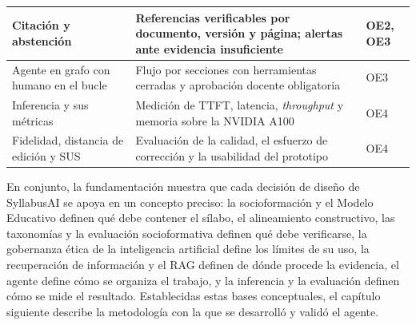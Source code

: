 \begin{table}[htbp]
\begin{tabular}{|>{\raggedright\arraybackslash}p{3.8cm}|>{\raggedright\arraybackslash}p{7.2cm}|>{\centering\arraybackslash}p{1.6cm}|}
    \hline
    Citación y abstención~\cite{gao2023alce} & Referencias verificables por documento, versión y página; alertas ante evidencia insuficiente & OE2, OE3 \\
    \hline
    Agente en grafo con humano en el bucle~\cite{langgraph2024} & Flujo por secciones con herramientas cerradas y aprobación docente obligatoria & OE3 \\
    \hline
    Inferencia y sus métricas~\cite{kwon2023vllm} & Medición de TTFT, latencia, \textit{throughput} y memoria sobre la NVIDIA A100 & OE4 \\
    \hline
    Fidelidad, distancia de edición y SUS~\cite{es2024ragas,levenshtein1966,brooke1996sus} & Evaluación de la calidad, el esfuerzo de corrección y la usabilidad del prototipo & OE4 \\
    \hline
  \end{tabular}
  \par\vspace{6pt}\normalsize\justifying
\end{table}

En conjunto, la fundamentación muestra que cada decisión de diseño de SyllabusAI se apoya en un concepto preciso: la socioformación y el Modelo Educativo definen qué debe contener el sílabo, el alineamiento constructivo, las taxonomías y la evaluación socioformativa definen qué debe verificarse, la gobernanza ética de la inteligencia artificial define los límites de su uso, la recuperación de información y el RAG definen de dónde procede la evidencia, el agente define cómo se organiza el trabajo, y la inferencia y la evaluación definen cómo se mide el resultado. Establecidas estas bases conceptuales, el capítulo siguiente describe la metodología con la que se desarrolló y validó el agente.
